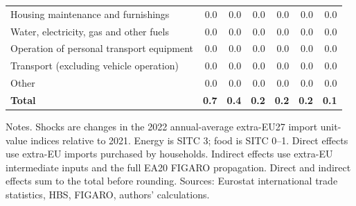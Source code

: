 \begin{table}[H]
{\begin{tabular}[t]{lrrrrrr}
Housing maintenance and furnishings & 0.0 & 0.0 & 0.0 & 0.0 & 0.0 & 0.0\\
Water, electricity, gas and other fuels & 0.0 & 0.0 & 0.0 & 0.0 & 0.0 & 0.0\\
Operation of personal transport equipment & 0.0 & 0.0 & 0.0 & 0.0 & 0.0 & 0.0\\
Transport (excluding vehicle operation) & 0.0 & 0.0 & 0.0 & 0.0 & 0.0 & 0.0\\
Other & 0.0 & 0.0 & 0.0 & 0.0 & 0.0 & 0.0\\
\textbf{Total} & \textbf{0.7} & \textbf{0.4} & \textbf{0.2} & \textbf{0.2} & \textbf{0.2} & \textbf{0.1}\\
\bottomrule
\end{tabular}
}%
\par\vspace{0.35em}\footnotesize\noindent Notes. Shocks are changes in the 2022 annual-average extra-EU27 import unit-value indices relative to 2021. Energy is SITC 3; food is SITC 0--1. Direct effects use extra-EU imports purchased by households. Indirect effects use extra-EU intermediate inputs and the full EA20 FIGARO propagation. Direct and indirect effects sum to the total before rounding. Sources: Eurostat international trade statistics, HBS, FIGARO, authors' calculations.
\end{table}
